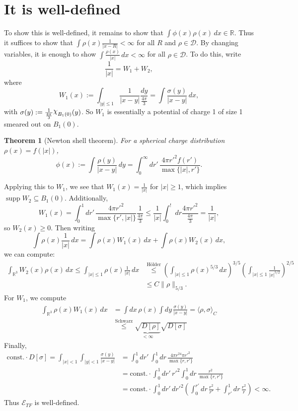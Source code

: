 \documentclass[11pt]{amsart}
\newcommand{\R}{\mathbb{R}}
\DeclareRobustCommand{\Chi}{{\mathpalette\irchi\relax}}
\newcommand{\irchi}[2]{\raisebox{\depth}{$#1\chi$}} %
\newtheorem{thm}{Theorem}
\theoremstyle{definition}
\theoremstyle{definition}
\theoremstyle{definition}
\numberwithin{equation}{section}
\begin{document}
\section{It is well-defined}
To show this is well-defined, it remains to show that $\int\phi(x)\rho(x)\,dx\in\R$. Thus it suffices to show that $\int \rho(x)\frac{1}{|x-R|}<\infty$ for all $R$ and $\rho\in\mathcal{D}$. By changing variables, it is enough to show $\int\frac{\rho(x)}{|x|}\,dx<\infty$ for all $\rho\in\mathcal{D}$. To do this, write
\[
\frac{1}{|x|}=W_1+W_2,
\]
where
\[
W_1(x):=\int_{|y|\le1}\frac{1}{|x-y|}\frac{dy}{\frac{4\pi}{3}}=\int\frac{\sigma(y)}{|x-y|}\,dx,
\]
with $\sigma(y):=\frac{1}{\frac{4\pi}{3}}\Chi_{B_1(0)}(y)$. So $W_1$ is essentially a potential of charge 1 of size 1 smeared out on $B_1(0)$.
\begin{thm}[Newton shell theorem]\label{thm:newton}
For a spherical charge distribution $\rho(x)=f(|x|)$,
\begin{equation}
\phi(x):=\int\frac{\rho(y)}{|x-y|}\,dy=\int_0^\infty dr'\,\frac{4\pi r'^2f(r')}{\max\{|x|,r'\}}.
\end{equation}
\end{thm}
Applying this to $W_1$, we see that $W_1(x)=\frac{1}{|x|}$ for $|x|\ge1$, which implies $\operatorname{supp}W_2\subseteq B_1(0)$.  Additionally,
\[
W_1(x)=\int_0^1dr'\,\frac{4\pi r'^2}{\max\{r',|x|\}}\frac{1}{\frac{4\pi}{3}}\le\frac{1}{|x|}\int_0^!\,dr\frac{4\pi r'^2}{\frac{4\pi}{3}}=\frac{1}{|x|},
\]
so $W_2(x)\ge0$.
Then writing
\begin{equation}
\int\rho(x)\frac{1}{|x|}\,dx=\int\rho(x)W_1(x)\,dx+\int\rho(x)W_2(x)\,dx,
\end{equation}
we can compute:
\begin{align*}
\int_{\R^3}W_2(x)\rho(x)\,dx\le\int_{|x|\le1}\rho(x)\frac{1}{|x|}\,dx&\stackrel{\text{H\"older}}{\le}\left(\int_{|x|\le1}\rho(x)^{5/3}\,dx\right)^{3/5}\left(\int_{|x|\le1}\frac{1}{|x|^{5/2}}\right)^{2/5}\\
&\le C\|\rho\|_{5/3}.
\end{align*}
For $W_1$, we compute
\begin{align*}
\int_{\R^3}\rho(x)W_1(x)\,dx&=\int dx\,\rho(x)\int dy\,\frac{\sigma(y)}{|x-y|}=\langle\rho,\sigma\rangle_C\\
&\stackrel{\text{Schwarz}}{\le}\underbrace{\sqrt{D[\rho]}}_{<\infty}\sqrt{D[\sigma]}
\end{align*}
Finally,
\begin{align*}
\text{const.}\cdot D[\sigma]=\int_{|x|<1}\int_{|y|<1}\frac{\sigma(y)}{|x-y|}&=\int_0^1 dr'\,\int_0^1 dr\,\frac{4\pi r^24\pi r'^2}{\max\{r,r'\}}\\
&=\text{const.}\cdot\int_0^1 dr'\,r'^2\int_0^1 dr\,\frac{r^2}{\max\{r,r'\}}\\
&=\text{const.}\cdot\int_0^1 dr'\,dr'^2\left(\int_0^{r'}dr\,\frac{r^2}{r'}+\int_{r'}^1 dr\,\frac{r^2}{r}\right)<\infty.
\end{align*}
Thus $\mathcal{E}_{TF}$ is well-defined.
\end{document}
